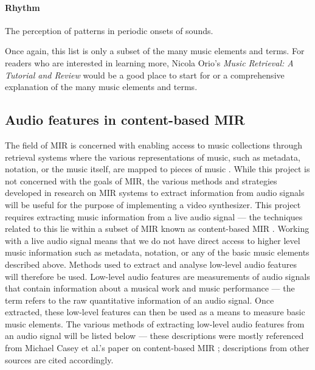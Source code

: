 \documentclass[../initial_thesis.tex]{subfiles}
\begin{document}
\paragraph{Rhythm} The perception of patterns in periodic onsets of sounds.

\vspace{\baselineskip}

Once again, this list is only a subset of the many music elements and terms. For readers who are interested in learning more, Nicola Orio's \textit{Music Retrieval: A Tutorial and Review} \cite{Orio2006} would be a good place to start for or a comprehensive explanation of the many music elements and terms.

\subsection{Audio features in content-based MIR}\label{sec:lowlevelaudio}
The field of MIR is concerned with enabling access to music collections through retrieval systems where the various representations of music, such as metadata, notation, or the music itself, are mapped to pieces of music \cite{Downie}. While this project is not concerned with the goals of MIR, the various methods and strategies developed in research on MIR systems to extract information from audio signals will be useful for the purpose of implementing a video synthesizer. This project requires extracting music information from a live audio signal --- the techniques related to this lie within a subset of MIR known as content-based MIR \cite{Casey2008}. Working with a live audio signal means that we do not have direct access to higher level music information such as metadata, notation, or any of the basic music elements described above. Methods used to extract and analyse low-level audio features will therefore be used. Low-level audio features are measurements of audio signals that contain information about a musical work and music performance \cite{Casey2008} --- the term refers to the raw quantitative information of an audio signal. Once extracted, these low-level features can then be used as a means to measure basic music elements. The various methods of extracting low-level audio features from an audio signal will be listed below --- these descriptions were mostly referenced from Michael Casey et al.'s paper on content-based MIR \cite{Casey2008}; descriptions from other sources are cited accordingly.
\end{document}
